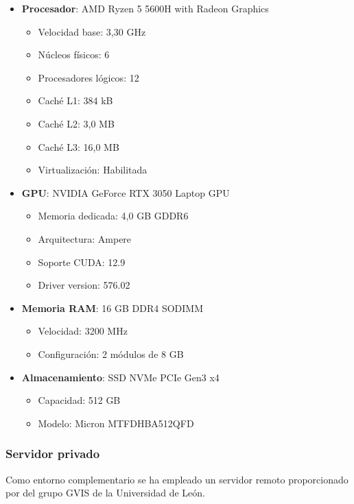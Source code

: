 \documentclass[12pt,a4paper,onecolumn,oneside]{report}
\begin{document}
\begin{itemize}
    \item \textbf{Procesador}: AMD Ryzen 5 5600H with Radeon Graphics
    \begin{itemize}
        \item Velocidad base: 3,30 GHz
        \item Núcleos físicos: 6
        \item Procesadores lógicos: 12
        \item Caché L1: 384 kB
        \item Caché L2: 3,0 MB  
        \item Caché L3: 16,0 MB
        \item Virtualización: Habilitada
    \end{itemize}
    
    \item \textbf{GPU}: NVIDIA GeForce RTX 3050 Laptop GPU
    \begin{itemize}
        \item Memoria dedicada: 4,0 GB GDDR6
        \item Arquitectura: Ampere
        \item Soporte CUDA: 12.9
        \item Driver version: 576.02
    \end{itemize}
    
    \item \textbf{Memoria RAM}: 16 GB DDR4 SODIMM
    \begin{itemize}
        \item Velocidad: 3200 MHz
        \item Configuración: 2 módulos de 8 GB
    \end{itemize}
    
    \item \textbf{Almacenamiento}: SSD NVMe PCIe Gen3 x4
    \begin{itemize}
        \item Capacidad: 512 GB
        \item Modelo: Micron MTFDHBA512QFD
    \end{itemize}
\end{itemize}

\subsubsection{Servidor privado}
\label{sec:servidor_privado}
Como entorno complementario se ha empleado un servidor remoto proporcionado por del grupo GVIS de la Universidad de León.
\end{document}

